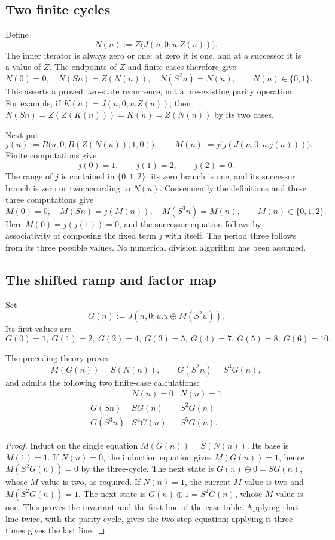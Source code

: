 \subsection{Two finite cycles}\label{js:cycles}

Define
\[
 N(n):=Z\bigl(J(n,0;u.Z(u))\bigr).
\]
The inner iterator is always zero or one: at zero it is one, and at a
successor it is a value of $Z$.  The endpoints of $Z$ and finite cases
therefore give
\[
 N(0)=0,\quad N(Sn)=Z(N(n)),\quad N(S^2n)=N(n),
 \qquad N(n)\in\{0,1\}.
 \tag{Parity cycle}\label{js:parity}
\]
This asserts a proved two-state recurrence, not a pre-existing parity
operation.  For example, if $K(n)=J(n,0;u.Z(u))$, then
$N(Sn)=Z(Z(K(n)))=K(n)=Z(N(n))$ by its two cases.

Next put
\[
 j(u):=B\bigl(u,0,B(Z(N(u)),1,0)\bigr),\qquad
 M(n):=j\bigl(j(J(n,0;u.j(u)))\bigr).
\]
Finite computations give
\[
 j(0)=1,\qquad j(1)=2,\qquad j(2)=0.
\]
The range of $j$ is contained in $\{0,1,2\}$: its zero branch is
one, and its successor branch is zero or two according to $N(u)$.
Consequently the definitions and these three computations give
\[
 M(0)=0,\quad M(Sn)=j(M(n)),\quad M(S^3n)=M(n),
 \qquad M(n)\in\{0,1,2\}.
 \tag{Three-cycle}\label{js:three-cycle}
\]
Here $M(0)=j(j(1))=0$, and the successor equation follows by
associativity of composing the fixed term $j$ with itself.  The period
three follows from its three possible values.  No numerical division
algorithm has been assumed.

\subsection{The shifted ramp and factor map}

Set
\[
 G(n):=J(n,0;u.u\oplus M(S^2u)).
\]
Its first values are
\[
 G(0)=1,\ G(1)=2,\ G(2)=4,\ G(3)=5,\
 G(4)=7,\ G(5)=8,\ G(6)=10.
\]

\begin{lemma}\label{js:ramp}
The preceding theory proves
\[
 M(G(n))=S(N(n)),\qquad G(S^2n)=S^3G(n),
 \tag{Ramp}\label{js:ramp-identities}
\]
and admits the following two finite-case calculations:
\[
 \begin{array}{c|cc}
 &N(n)=0&N(n)=1\\ \hline
 G(Sn)&S G(n)&S^2G(n)\\
 G(S^3n)&S^4G(n)&S^5G(n).
 \end{array}
 \tag{Ramp cases}\label{js:ramp-cases}
\]
\end{lemma}
\begin{proof}
Induct on the single equation $M(G(n))=S(N(n))$.
Its base is $M(1)=1$.  If $N(n)=0$, the induction equation gives
$M(G(n))=1$, hence $M(S^2G(n))=0$ by the three-cycle.  The next
state is $G(n)\oplus0=S G(n)$, whose $M$-value is two, as
required.  If $N(n)=1$, the current $M$-value is two and
$M(S^2G(n))=1$.  The next state is
$G(n)\oplus1=S^2G(n)$, whose $M$-value is one.  This proves
the invariant and the first line of the case table.  Applying that line
twice, with the parity cycle, gives the two-step equation; applying it
three times gives the last line.
\end{proof}

